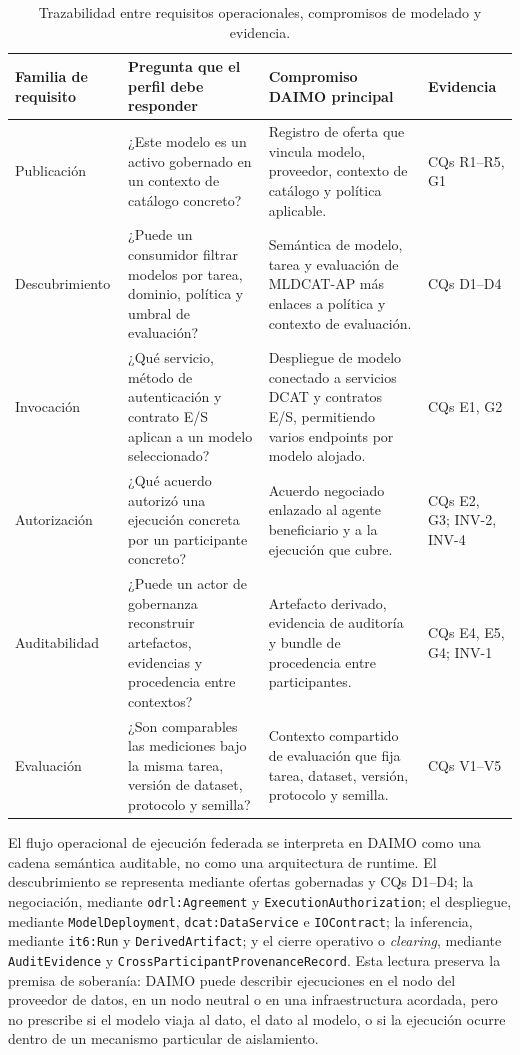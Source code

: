 \documentclass[Afour,sagev,times]{sagej}
\newcommand{\code}[1]{\texttt{#1}}
\begin{document}
\begin{table}[tb]
\small\sf\centering
\caption{Trazabilidad entre requisitos operacionales, compromisos de modelado y evidencia.\label{tab:req-trace}}
\begin{tabular}{@{}p{3.2cm}p{4.3cm}p{4.2cm}p{2.8cm}@{}}
\toprule
\textbf{Familia de requisito} & \textbf{Pregunta que el perfil debe responder} & \textbf{Compromiso DAIMO principal} & \textbf{Evidencia} \\
\midrule
Publicación & ¿Este modelo es un activo gobernado en un contexto de catálogo concreto? & Registro de oferta que vincula modelo, proveedor, contexto de catálogo y política aplicable. & CQs R1--R5, G1 \\
Descubrimiento & ¿Puede un consumidor filtrar modelos por tarea, dominio, política y umbral de evaluación? & Semántica de modelo, tarea y evaluación de MLDCAT-AP más enlaces a política y contexto de evaluación. & CQs D1--D4 \\
Invocación & ¿Qué servicio, método de autenticación y contrato E/S aplican a un modelo seleccionado? & Despliegue de modelo conectado a servicios DCAT y contratos E/S, permitiendo varios endpoints por modelo alojado. & CQs E1, G2 \\
Autorización & ¿Qué acuerdo autorizó una ejecución concreta por un participante concreto? & Acuerdo negociado enlazado al agente beneficiario y a la ejecución que cubre. & CQs E2, G3; INV-2, INV-4 \\
Auditabilidad & ¿Puede un actor de gobernanza reconstruir artefactos, evidencias y procedencia entre contextos? & Artefacto derivado, evidencia de auditoría y bundle de procedencia entre participantes. & CQs E4, E5, G4; INV-1 \\
Evaluación & ¿Son comparables las mediciones bajo la misma tarea, versión de dataset, protocolo y semilla? & Contexto compartido de evaluación que fija tarea, dataset, versión, protocolo y semilla. & CQs V1--V5 \\
\bottomrule
\end{tabular}
\end{table}

El flujo operacional de ejecución federada se interpreta en DAIMO como una cadena semántica auditable, no como una arquitectura de runtime. El descubrimiento se representa mediante ofertas gobernadas y CQs D1--D4; la negociación, mediante \code{odrl:Agreement} y \code{ExecutionAuthorization}; el despliegue, mediante \code{ModelDeployment}, \code{dcat:DataService} e \code{IOContract}; la inferencia, mediante \code{it6:Run} y \code{DerivedArtifact}; y el cierre operativo o \emph{clearing}, mediante \code{AuditEvidence} y \code{CrossParticipantProvenanceRecord}. Esta lectura preserva la premisa de soberanía: DAIMO puede describir ejecuciones en el nodo del proveedor de datos, en un nodo neutral o en una infraestructura acordada, pero no prescribe si el modelo viaja al dato, el dato al modelo, o si la ejecución ocurre dentro de un mecanismo particular de aislamiento.
\end{document}
